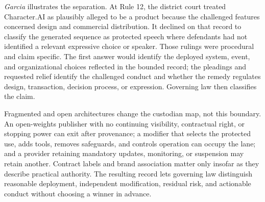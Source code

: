\emph{Garcia} illustrates the separation. At Rule 12, the district court treated Character.AI as plausibly alleged to be a product because the challenged features concerned design and commercial distribution. It declined on that record to classify the generated sequence as protected speech where defendants had not identified a relevant expressive choice or speaker. Those rulings were procedural and claim specific. The first answer would identify the deployed system, event, and organizational choices reflected in the bounded record; the pleadings and requested relief identify the challenged conduct and whether the remedy regulates design, transaction, decision process, or expression. Governing law then classifies the claim.

Fragmented and open architectures change the custodian map, not this boundary. An open-weights publisher with no continuing visibility, contractual right, or stopping power can exit after provenance; a modifier that selects the protected use, adds tools, removes safeguards, and controls operation can occupy the lane; and a provider retaining mandatory updates, monitoring, or suspension may retain another. Contract labels and brand association matter only insofar as they describe practical authority. The resulting record lets governing law distinguish reasonable deployment, independent modification, residual risk, and actionable conduct without choosing a winner in advance.
